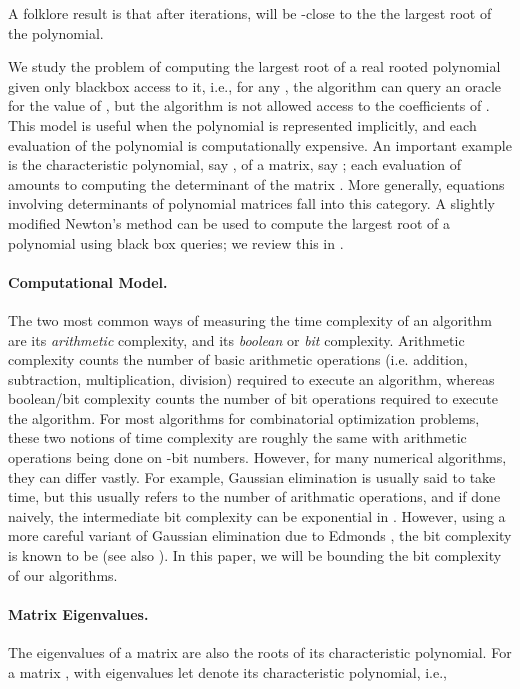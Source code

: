 \documentclass{article}[12pt]
\theoremstyle{definition}
\begin{document}
A folklore result is that after  iterations, 
 will be -close to the the largest root of the polynomial.


We study the problem of computing the largest root of a real rooted polynomial  given only 
blackbox access to it, i.e., for any , the algorithm can query an oracle for the
value of , but the algorithm is not allowed access to the coefficients of . 
This model is useful when the polynomial is represented implicitly, and each evaluation
of the polynomial is computationally expensive. An important example is the characteristic polynomial,
say , of a matrix, say ; each evaluation of  amounts to computing
the determinant of the matrix . More generally,   
equations involving determinants of polynomial matrices  fall into this category.
A slightly modified Newton's method can be used to compute the largest root of a polynomial 
using  black box queries; we review this in .

\paragraph{Computational Model.}
The two most common ways of measuring the time complexity of an algorithm are its 
{\em arithmetic} complexity, and its {\em boolean} or {\em bit} complexity.
Arithmetic complexity counts the number of basic arithmetic operations (i.e. addition, subtraction,
multiplication, division) required to execute an algorithm, whereas boolean/bit complexity
counts the number of bit operations required to execute the algorithm.
For most algorithms for combinatorial optimization problems, these two notions of time complexity are 
roughly the same with arithmetic operations being done on -bit numbers.
However, for many numerical algorithms, they can differ vastly.
For example, 
Gaussian elimination is usually said to take  time, but this usually refers to the number of 
arithmatic operations, and if done naively, the intermediate bit complexity can be exponential in 
\cite{b66,f77}.
However, using a more careful variant of 
Gaussian elimination due to Edmonds \cite{e67}, the bit complexity is known to be  
(see also \cite{bar68,dix82,s98}). 
In this paper, we will be bounding the bit complexity of our algorithms.  


\paragraph{Matrix Eigenvalues.}
The eigenvalues of a matrix are also the roots of its characteristic polynomial.
For a matrix , with eigenvalues  let 
 denote its characteristic polynomial, i.e.,
 
\end{document}

